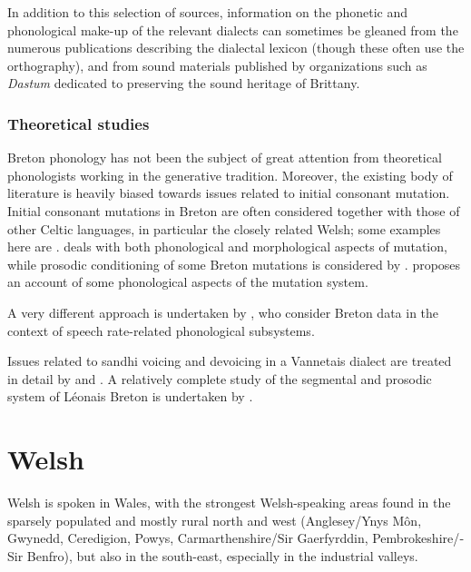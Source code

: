 In addition to this selection of sources, information on the phonetic and phonological make-up of the relevant dialects can sometimes be gleaned from the numerous publications describing the dialectal lexicon (though these often use the orthography), and from sound materials published by organizations such as \emph{Dastum} dedicated to preserving the sound heritage of Brittany.

\subsubsection{Theoretical studies}
\label{sec:theoretical-studies}

Breton phonology has not been the subject of great attention from theoretical phonologists working in the generative tradition. Moreover, the existing body of literature is heavily biased towards issues related to initial consonant mutation. Initial consonant mutations in Breton are often considered together with those of other Celtic languages, in particular the closely related Welsh; some examples here are \citet{willis,Pya97,green2003,greenbook}. \citet{stump-mixed,stump-nonlocal} deals with both phonological and morphological aspects of mutation, while prosodic conditioning of some Breton mutations is considered by \citet{pyatt}. \citet{wolf2005,wolf-forautosegs} proposes an account of some phonological aspects of the mutation system.

A very different approach is undertaken by \citet{dressler73:_alleg_lentor,dressler80:_etudes}, who consider Breton data in the context of speech rate-related phonological subsystems.

Issues related to sandhi voicing and devoicing in a Vannetais dialect are treated in detail by \citet{kramer-breton} and \citet{hall09:_laryn_breton}. A relatively complete study of the segmental and prosodic system of Léonais Breton is undertaken by \citet{carlyle88:_breton}.

\section{Welsh}
\label{sec:welsh}

Welsh is spoken in Wales, with the strongest Welsh-speaking areas found in the sparsely populated and mostly rural north and west (Anglesey\fshyp Ynys Môn, Gwynedd, Ceredigion, Powys, Carmarthenshire\fshyp Sir Gaerfyrddin, Pembrokeshire\fshyp Sir Benfro), but also in the south\hyp east, especially in the industrial valleys.

